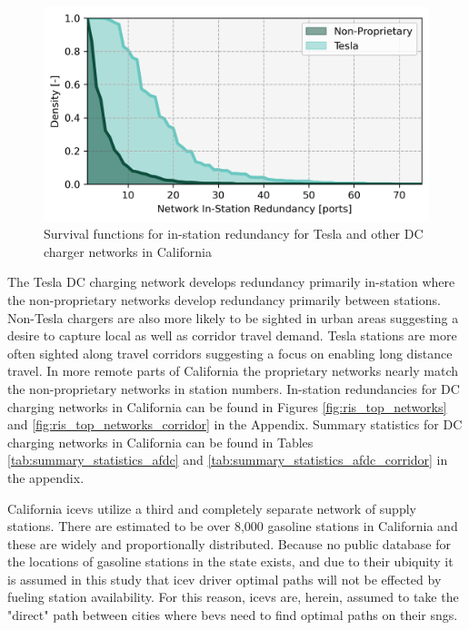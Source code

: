 \documentclass[11pt]{article}
\begin{document}
\begin{multicols}{2}
\begin{figure}[H]
	\centering
	\includegraphics[width = \linewidth]{figs/California_RIS_Hist.png}
	\caption{Survival functions for in-station redundancy for Tesla and other DC charger networks in California}
	\label{fig:network_histograms}
\end{figure}

The Tesla DC charging network develops redundancy primarily in-station where the non-proprietary networks develop redundancy primarily between stations. Non-Tesla chargers are also more likely to be sighted in urban areas suggesting a desire to capture local as well as corridor travel demand. Tesla stations are more often sighted along travel corridors suggesting a focus on enabling long distance travel. In more remote parts of California the proprietary networks nearly match the non-proprietary networks in station numbers. In-station redundancies for DC charging networks in California can be found in Figures \ref{fig:ris_top_networks} and \ref{fig:ris_top_networks_corridor} in the Appendix. Summary statistics for DC charging networks in California can be found in Tables \ref{tab:summary_statistics_afdc} and \ref{tab:summary_statistics_afdc_corridor} in the appendix.

California \glspl{icev} utilize a third and completely separate network of supply stations. There are estimated to be over 8,000 gasoline stations in California \cite{CEC_2022} and these are widely and proportionally distributed. Because no public database for the locations of gasoline stations in the state exists, and due to their ubiquity it is assumed in this study that \gls{icev} driver optimal paths will not be effected by fueling station availability. For this reason, \glspl{icev} are, herein, assumed to take the "direct" path between cities where \glspl{bev} need to find optimal paths on their \glspl{sng}.


\end{multicols}
\end{document}

